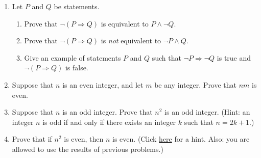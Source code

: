 \begin{enumerate}
  (Two statement forms are equivalent if they have the same truth tables, and here, a counterexample simply means some choice of truth values for $P,Q,$ and $R$ such that the two statement forms give different outputs.)
\item Let $P$ and $Q$ be statements.
  \begin{enumerate}
  \item Prove that $\neg(P \Rightarrow Q)$ is equivalent to $P \wedge \neg Q$.
  \item Prove that $\neg(P \Rightarrow Q)$ is \emph{not} equivalent to $\neg P \wedge Q$.
  \item Give an example of statements $P$ and $Q$ such that $\neg P \Rightarrow \neg Q$ is true and $\neg(P \Rightarrow Q)$ is false.
  \end{enumerate}



\item Suppose that $n$ is an even integer, and let $m$ be any integer. Prove that $nm$ is even.   
  
\item Suppose that $n$ is an odd integer. Prove that $n^2$ is an odd integer. (Hint: an integer $n$ is odd if and only if there exists an integer $k$ such that $n = 2k+1$.)

\item Prove that if $n^2$ is even, then $n$ is even.
  (Click \href{https://en.wikipedia.org/wiki/Proof_by_contrapositive}{{\color{red}here}} for a hint. Also: you are allowed to use the results of previous problems.)  
  \end{enumerate}



